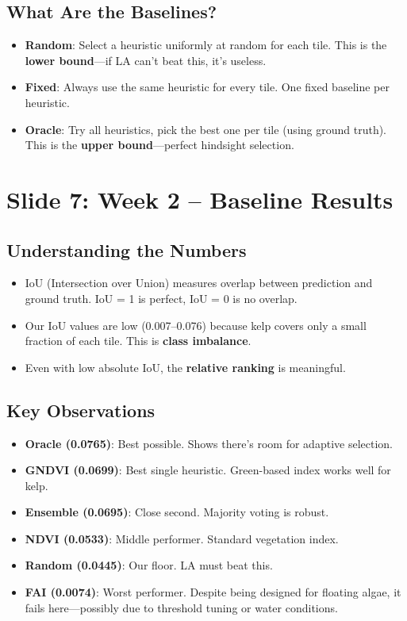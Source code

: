 \documentclass[11pt]{article}
\newenvironment{talkingpoints}{%
  \begin{itemize}[leftmargin=1.5em, itemsep=0.3em]
}{%
  \end{itemize}
}
\begin{document}
\subsection{What Are the Baselines?}

\begin{talkingpoints}
  \item \textbf{Random}: Select a heuristic uniformly at random for each tile. This is the \textbf{lower bound}---if LA can't beat this, it's useless.
  \item \textbf{Fixed}: Always use the same heuristic for every tile. One fixed baseline per heuristic.
  \item \textbf{Oracle}: Try all heuristics, pick the best one per tile (using ground truth). This is the \textbf{upper bound}---perfect hindsight selection.
\end{talkingpoints}

\section{Slide 7: Week 2 -- Baseline Results}

\subsection{Understanding the Numbers}

\begin{talkingpoints}
  \item IoU (Intersection over Union) measures overlap between prediction and ground truth. IoU = 1 is perfect, IoU = 0 is no overlap.
  \item Our IoU values are low (0.007--0.076) because kelp covers only a small fraction of each tile. This is \textbf{class imbalance}.
  \item Even with low absolute IoU, the \textbf{relative ranking} is meaningful.
\end{talkingpoints}

\subsection{Key Observations}

\begin{talkingpoints}
  \item \textbf{Oracle (0.0765)}: Best possible. Shows there's room for adaptive selection.
  \item \textbf{GNDVI (0.0699)}: Best single heuristic. Green-based index works well for kelp.
  \item \textbf{Ensemble (0.0695)}: Close second. Majority voting is robust.
  \item \textbf{NDVI (0.0533)}: Middle performer. Standard vegetation index.
  \item \textbf{Random (0.0445)}: Our floor. LA must beat this.
  \item \textbf{FAI (0.0074)}: Worst performer. Despite being designed for floating algae, it fails here---possibly due to threshold tuning or water conditions.
\end{talkingpoints}
\end{document}
